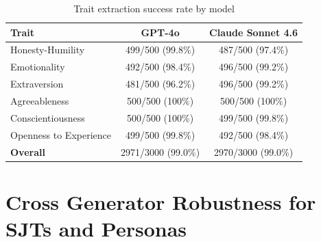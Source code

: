 \documentclass[11pt]{article}
\begin{document}

\begin{table}[H]
\centering
\caption{Trait extraction success rate by model}
\label{tab:trait_extraction_rate}
\footnotesize
\renewcommand\arraystretch{1.2}
\begin{tabularx}{\columnwidth}{@{}Xcc@{}}
\toprule
\textbf{Trait} & \textbf{GPT-4o} & \textbf{Claude Sonnet 4.6} \\
\midrule
Honesty-Humility            & 499/500 (99.8\%)   & 487/500 (97.4\%) \\
Emotionality                & 492/500 (98.4\%)   & 496/500 (99.2\%) \\
Extraversion                & 481/500 (96.2\%)   & 496/500 (99.2\%) \\
Agreeableness               & 500/500 (100\%)    & 500/500 (100\%) \\
Conscientiousness           & 500/500 (100\%)    & 499/500 (99.8\%) \\
Openness to Experience      & 499/500 (99.8\%)   & 492/500 (98.4\%) \\
\midrule
\textbf{Overall}            & 2971/3000 (99.0\%) & 2970/3000 (99.0\%) \\
\bottomrule
\end{tabularx}
\end{table}

\section{Cross Generator Robustness for SJTs and Personas}
\label{app:cross_generator_robustness_sjt_personas}
\end{document}
